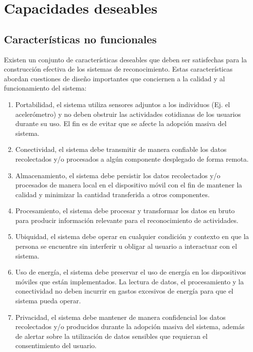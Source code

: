 \section{Capacidades deseables}

\subsection{Características no funcionales}

\label{sec431:caracteristicas}Existen un conjunto de características
deseables que deben ser satisfechas para la construcción efectiva
de los sistemas de reconocimiento. Estas características abordan cuestiones
de diseño importantes que conciernen a la calidad y al funcionamiento
del sistema:
\begin{enumerate}
\item Portabilidad, el sistema utiliza sensores adjuntos a los individuos
(Ej. el acelerómetro) y no deben obstruir las actividades cotidianas
de los usuarios durante su uso. El fin es de evitar que se afecte
la adopción masiva del sistema. 
\item Conectividad, el sistema debe transmitir de manera confiable los datos
recolectados y/o procesados a algún componente desplegado de forma
remota. 
\item Almacenamiento, el sistema debe persistir los datos recolectados y/o
procesados de manera local en el dispositivo móvil con el fin de mantener
la calidad y minimizar la cantidad transferida a otros componentes.
\item Procesamiento, el sistema debe procesar y transformar los datos en
bruto para producir información relevante para el reconocimiento de
actividades.
\item Ubiquidad, el sistema debe operar en cualquier condición y contexto
en que la persona se encuentre sin interferir u obligar al usuario
a interactuar con el sistema.
\item Uso de energía, el sistema debe preservar el uso de energía en los
dispositivos móviles que están implementados. La lectura de datos,
el procesamiento y la conectividad no deben incurrir en gastos excesivos
de energía para que el sistema pueda operar.
\item Privacidad, el sistema debe mantener de manera confidencial los datos
recolectados y/o producidos durante la adopción masiva del sistema,
además de alertar sobre la utilización de datos sensibles que requieran
el consentimiento del usuario.
\end{enumerate}

